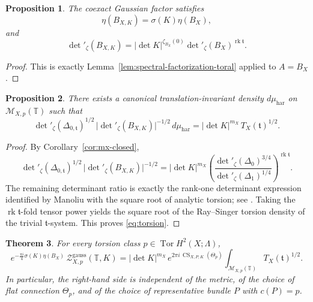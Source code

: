 \documentclass[12pt]{amsart}
\numberwithin{equation}{section}
\newtheorem{theorem}{Theorem}[section]
\newtheorem{prop}[theorem]{Proposition}
\begin{document}
\begin{prop}\label{prop:toral-determinant-factor}
The coexact Gaussian factor satisfies
\[
\eta(B_{X,K})=\sigma(K)\eta(B_X),
\]
and
\[
\det\nolimits'_{\zeta}(B_{X,K})
=
|\det K|^{\zeta_{B_X}(0)}\det\nolimits'_{\zeta}(B_X)^{\operatorname{rk}\mathfrak t}.
\]
\end{prop}

\begin{proof}
This is exactly Lemma~\ref{lem:spectral-factorization-toral} applied to \(A=B_X\).
\end{proof}

\begin{prop}
\label{prop:torsion-rewrite}
There exists a canonical translation-invariant density \(d\mu_{\mathrm{har}}\) on
\(\mathcal M_{X,p}(\mathbb T)\) such that
\begin{equation}
\label{eq:torsion}
\det\nolimits'_{\zeta}(\Delta_{0,\mathfrak t})^{1/2}\,
\bigl|\det\nolimits'_{\zeta}(B_{X,K})\bigr|^{-1/2}\,
d\mu_{\mathrm{har}}
=
|\det K|^{m_X}\,
T_X(\mathfrak t)^{1/2}.
\end{equation}
\end{prop}

\begin{proof}
By Corollary~\ref{cor:mx-closed},
\[
\det\nolimits'_{\zeta}(\Delta_{0,\mathfrak t})^{1/2}
\,
\bigl|\det\nolimits'_{\zeta}(B_{X,K})\bigr|^{-1/2}
=
|\det K|^{m_X}
\left(
\frac{\det\nolimits'_{\zeta}(\Delta_0)^{3/4}}
{\det\nolimits'_{\zeta}(\Delta_1)^{1/4}}
\right)^{\operatorname{rk}\mathfrak t}.
\]
The remaining determinant ratio is exactly the rank-one determinant expression identified
by Manoliu with the square root of analytic torsion; see \cite[Eqs.~(III.14)--(III.15)]{Manoliu3}.
Taking the \(\operatorname{rk}\mathfrak t\)-fold tensor power yields the square root of the
Ray--Singer torsion density of the trivial \(\mathfrak t\)-system. This proves \eqref{eq:torsion}.
\end{proof}

\begin{theorem}
\label{thm:closed-torsion-eta}
For every torsion class \(p\in \operatorname{Tor}H^2(X;\Lambda)\),
\begin{equation}
\label{eq:closed-torsion-eta}
e^{-\frac{\pi i}{4}\sigma(K)\eta(B_X)}\,
\mathcal Z^{\mathrm{gauss}}_{X,p}(\mathbb T,K)
=
|\det K|^{m_X}\,
e^{2\pi i\,\operatorname{CS}_{X,P,K}(\Theta_p)}
\int_{\mathcal M_{X,p}(\mathbb T)}
T_X(\mathfrak t)^{1/2}.
\end{equation}
In particular, the right-hand side is independent of the metric, of the choice of flat connection \(\Theta_p\), and of the choice of representative bundle \(P\) with
\(c(P)=p\).
\end{theorem}
\end{document}
